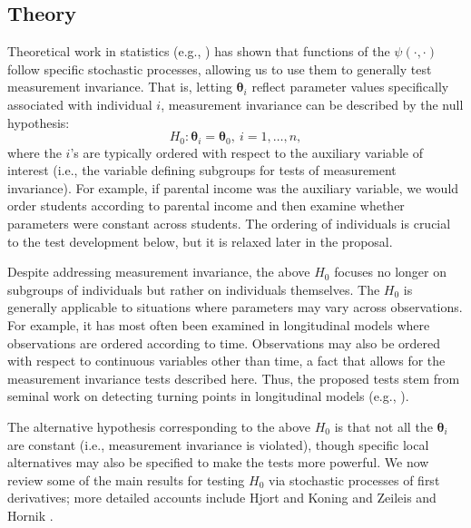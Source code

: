 \documentclass[man]{apa}
\begin{document}
\subsection{Theory}
Theoretical work in statistics (e.g., ) has shown
that functions of the 
$\psi(\cdot, \cdot)$ follow specific stochastic processes, allowing
us to use them to generally test measurement
invariance.  
That is, letting ${\bm \theta}_i$ reflect parameter values
specifically 
associated with individual $i$, measurement invariance can be 
described by the null hypothesis:
\begin{equation}
    \label{eq:h0}
    H_0: {\bm \theta}_i = {\bm \theta}_0,\ i=1,\ldots,n,
\end{equation}
where the $i$'s are typically ordered with respect to the auxiliary
variable of interest (i.e., the variable defining subgroups for tests
of measurement invariance).  For example, if parental income was the
auxiliary variable, we would order students according to parental
income and then examine whether parameters were constant across
students.  The ordering of individuals is crucial to
the test development below, but it is relaxed later in the proposal.

Despite addressing measurement
invariance, the above $H_0$ focuses no longer on subgroups of
individuals but rather on individuals themselves.  The $H_0$ is
generally applicable to situations where parameters may vary across
observations.  For example, it has most often been examined in
longitudinal models where observations are 
ordered according to time.
Observations may also be ordered with respect to 
continuous variables other than time, a fact that allows for the
measurement invariance tests described here.  Thus, the proposed tests
stem from seminal work on
detecting turning points in longitudinal models (e.g.,
).

The alternative hypothesis corresponding to the above $H_0$ is that not
all the ${\bm{\theta}}_i$ are constant (i.e., measurement invariance is
violated), though specific local alternatives may also be specified to
make the tests more powerful.  We now review some of the main results
for testing $H_0$ via stochastic processes of first derivatives; more
detailed accounts include Hjort and Koning \citeyear{HjoKon02} and
Zeileis and Hornik \citeyear{ZeiHor07}.

\end{document}
